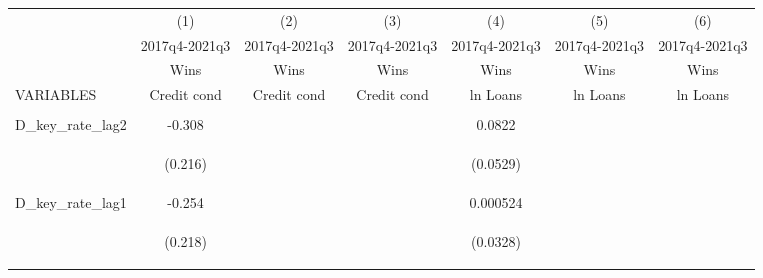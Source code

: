 \documentclass[]{article}
\begin{document}
\begin{center}
\begin{tabular}{lcccccc} \hline
 & (1) & (2) & (3) & (4) & (5) & (6) \\
 & 2017q4-2021q3 & 2017q4-2021q3 & 2017q4-2021q3 & 2017q4-2021q3 & 2017q4-2021q3 & 2017q4-2021q3 \\
 & Wins & Wins & Wins & Wins & Wins & Wins \\
VARIABLES & Credit cond & Credit cond & Credit cond & ln Loans & ln Loans & ln Loans \\ \hline
\vspace{4pt} & \begin{footnotesize}\end{footnotesize} & \begin{footnotesize}\end{footnotesize} & \begin{footnotesize}\end{footnotesize} & \begin{footnotesize}\end{footnotesize} & \begin{footnotesize}\end{footnotesize} & \begin{footnotesize}\end{footnotesize} \\
D\_key\_rate\_lag2 & -0.308 &  &  & 0.0822 &  &  \\
\vspace{4pt} & \begin{footnotesize}(0.216)\end{footnotesize} & \begin{footnotesize}\end{footnotesize} & \begin{footnotesize}\end{footnotesize} & \begin{footnotesize}(0.0529)\end{footnotesize} & \begin{footnotesize}\end{footnotesize} & \begin{footnotesize}\end{footnotesize} \\
D\_key\_rate\_lag1 & -0.254 &  &  & 0.000524 &  &  \\
\vspace{4pt} & \begin{footnotesize}(0.218)\end{footnotesize} & \begin{footnotesize}\end{footnotesize} & \begin{footnotesize}\end{footnotesize} & \begin{footnotesize}(0.0328)\end{footnotesize} & \begin{footnotesize}\end{footnotesize} & \begin{footnotesize}\end{footnotesize} \\

\end{tabular}
\end{center}
\end{document}
